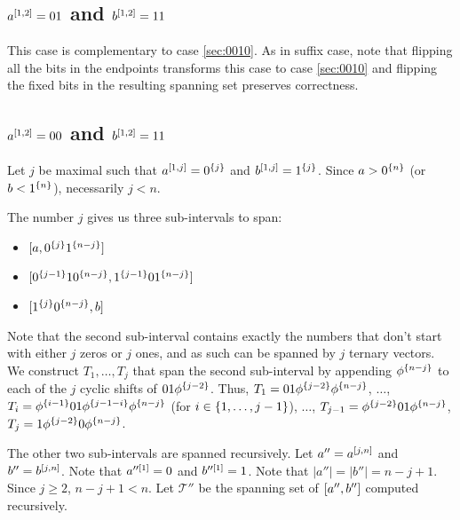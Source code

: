 \subsection{\texorpdfstring
{$a^{[1, 2]} = 01$ and $b^{[1, 2]} = 11$}
{ = 01 and  = 11}
}

This case is complementary to case \ref{sec:0010}.
As in suffix case,
note that flipping all the bits in the endpoints
transforms this case to case \ref{sec:0010}
and flipping the fixed bits in the resulting spanning set
preserves correctness.

\subsection{\texorpdfstring
{$a^{[1, 2]} = 00$ and $b^{[1, 2]} = 11$}
{ = 00 and  = 11}
}

Let $j$ be maximal such that
$a^{[1, j]} = 0^{\{j\}}$ and
$b^{[1, j]} = 1^{\{j\}}$.
Since $a > 0^{\{n\}}$ (or $b < 1^{\{n\}}$),
necessarily $j < n$.

The number $j$ gives us three sub-intervals to span:

\begin{itemize}
\item $[a, 0^{\{j\}} 1^{\{n-j\}}]$
\item $[0^{\{j-1\}} 1 0^{\{n-j\}}, 1^{\{j-1\}} 0 1^{\{n-j\}}]$
\item $[1^{\{j\}} 0^{\{n-j\}}, b]$
\end{itemize}

Note that the second sub-interval contains exactly
the numbers that don't start with either $j$ zeros
or $j$ ones,
and as such can be spanned by $j$ ternary vectors.
We construct $T_1, \ldots, T_j$ that span
the second sub-interval
by appending $\phi^{\{n-j\}}$
to each of the $j$ cyclic shifts of $01 \phi^{\{j-2\}}$.
Thus,
$T_1 = 01 \phi^{\{j-2\}} \phi^{\{n-j\}}$,
$\ldots$,
$T_i = \phi^{\{i-1\}} 01 \phi^{\{j-1-i\}} \phi^{\{n-j\}}$
(for $i \in \{1, \ldots, j-1\}$),
$\ldots$,
$T_{j-1} = \phi^{\{j-2\}} 01 \phi^{\{n-j\}}$,
$T_j = 1 \phi^{\{j-2\}} 0 \phi^{\{n-j\}}$.

The other two sub-intervals are spanned recursively.
Let $a'' = a^{[j, n]}$ and $b'' = b^{[j, n]}$.
Note that $a''^{[1]} = 0$ and $b''^{[1]} = 1$.
Note that $|a''| = |b''| = n - j + 1$.
Since $j \geq 2$, $n-j+1 < n$.
Let $\mathcal{T}''$ be the spanning set
of $[a'', b'']$ computed recursively.

